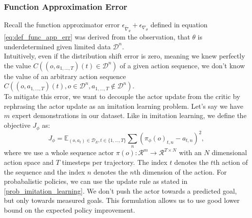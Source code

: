 \subsubsection{Function Approximation Error}
\label{func_app_error}
Recall the function approximator error $\epsilon_{\widetilde{\nabla}_{\theta}} + \epsilon_{\nabla_{\theta}}$ defined in equation \ref{eq:def_func_app_err} was 
derived from the observation, that $\theta$ is underdetermined 
given limited data $\mathcal{D}^n$. \\
Intuitively, even if the distribution shift error is zero, meaning we knew perfectly the value 
$C((o, a_{1,...,T})(t) \in \mathcal{D}^n)$ of a given action sequence, we don't know the value of an arbitrary action sequence
$C((o, a_{1,...,T})(t), o \in \mathcal{D}^n, a_{1,...,T} \notin \mathcal{D}^n)$.\\
To mitigate this error, we want to decouple the actor update from the critic by rephrasing the actor update as an imitation learning problem. 
Let's say we have $m$ expert demonstrations in our dataset. 
Like in imitation learning, we define the objective $J_{\phi}$ as:
\begin{equation}
    J_{\phi} = \mathbb{E}_{(o, a_{t}) \in \mathcal{D}_E, t \in \{1, ..., T\}}\sum_n \left(\pi_{\phi}(o)_{t, n} - a_{t, n}\right)^2,
\end{equation}
where we use a whole sequence actor 
$\pi(o):\mathcal{R}^m \rightarrow \mathcal{R}^{T \times N}$ with an $N$ dimensional action space and $T$ timesteps per trajectory. The index $t$ denotes the $t$th action of the sequence and the index $n$ denotes the $n$th dimension of 
the action. For probabalistic policies, we can use the update rule as stated in \ref{prob_imitation_learning}. We don't push the actor towards a predicted goal, 
but only towards measured goals. This formulation allows us to use good lower bound on the expected policy improvement.\\

